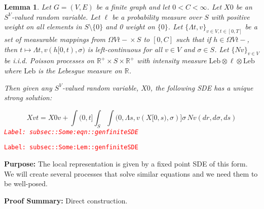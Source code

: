 \documentclass[12pt]{article}
\newcommand{\mb}{\mathbb}
\newcommand{\te}{\text}
\newcommand{\tr}{\textcolor{red}}
\newcommand{\labe}[1]{\tr{\texttt{Label: #1}}}
\newcommand{\purpose}{\textbf{Purpose: }}
\newcommand{\pfsum}{\textbf{Proof Summary: }}
\newcommand{\ind}{\hspace{24pt}}
\renewcommand{\v}{v}							%
\renewcommand{\S}{S}							%
\newcommand{\s}{\sigma}							%
\newcommand{\T}{T}								%
\renewcommand{\t}{t}							%
\renewcommand{\tt}{s}							%
\newcommand{\X}{X}								%
\newcommand{\carp}[1]{^{#1}}					%
\newcommand{\const}{C}							%
\newcommand{\poiss}{N}							%
\newcommand{\leb}{\te{Leb}}						%
\newcommand{\Sm}{\ell}							%
\renewcommand{\r}{r}							%
\newcommand{\ratee}{\Lambda}					%
\newtheorem{lem}[thms]{Lemma}
\begin{document}
\begin{lem}
Let \(G = (V,E)\) be a finite graph and let \(0 < \const{}< \infty\). Let \(\X{}{0}\) be an \(\S\carp{V}\)-valued random variable. Let \(\Sm\) be a probability measure over \(\S\) with positive weight on all elements in \(\S\setminus\{0\}\) and 0 weight on \(\{0\}\). Let \(\{\ratee{\t,\v}\}_{\v \in V,\t\in [0,\T]}\) be a set of measurable mappings from \(\Omega{V}{\t-} \times \S\) to \([0,\const{}]\) such that if \(h \in \Omega{V}{\t-}\), then \(\t\mapsto \ratee{\t,\v}(h[0,\t),\s)\) is left-continuous for all \(\v \in V\) and \(\s \in \S\). Let \(\{\poiss{\v}\}_{\v \in V}\) be i.i.d. Poisson processes on \(\mb{R}^+\times \S\times\mb{R}^+\) with intensity measure \(\leb\otimes\Sm\otimes\leb\) where \(\leb\) is the Lebesgue measure on \(\mb{R}\).

\ind Then given any \(\S\carp{V}\)-valued random variable, \(\X{}{0}\), the following SDE has a unique strong solution:

\begin{equation}
\X{\v}{\t} = \X{0}{\v} + \int{(0,\t]}\int_\S\int{(0,\ratee{\tt,\v}(\X{}{[0,\tt)},\s)]}  \s\,\poiss{\v}(d\r,d\s,d\tt)
\label{subsec::Some:eqn::genfiniteSDE}
\end{equation}
\labe{subsec::Some:eqn::genfiniteSDE}
\label{subsec::Some:Lem::genfiniteSDE}
\end{lem}
\labe{subsec::Some:Lem::genfiniteSDE}

\purpose The local representation is given by a fixed point SDE of this form. We will create several processes that solve similar equations and we need them to be well-posed.

\pfsum Direct construction.
\end{document}
